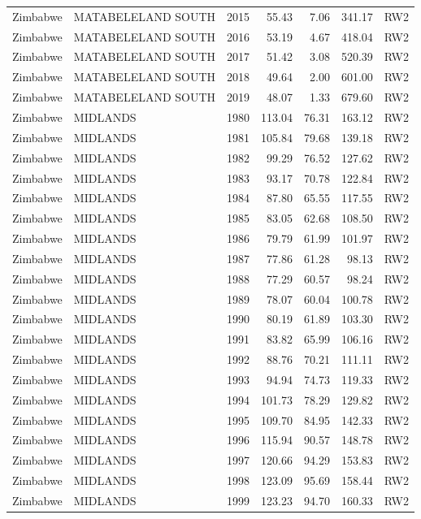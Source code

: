 \begin{longtable}{lllrrrl}
  Zimbabwe & MATABELELAND SOUTH & 2015 & 55.43 & 7.06 & 341.17 & RW2 \\ 
  Zimbabwe & MATABELELAND SOUTH & 2016 & 53.19 & 4.67 & 418.04 & RW2 \\ 
  Zimbabwe & MATABELELAND SOUTH & 2017 & 51.42 & 3.08 & 520.39 & RW2 \\ 
  Zimbabwe & MATABELELAND SOUTH & 2018 & 49.64 & 2.00 & 601.00 & RW2 \\ 
  Zimbabwe & MATABELELAND SOUTH & 2019 & 48.07 & 1.33 & 679.60 & RW2 \\ 
  Zimbabwe & MIDLANDS & 1980 & 113.04 & 76.31 & 163.12 & RW2 \\ 
  Zimbabwe & MIDLANDS & 1981 & 105.84 & 79.68 & 139.18 & RW2 \\ 
  Zimbabwe & MIDLANDS & 1982 & 99.29 & 76.52 & 127.62 & RW2 \\ 
  Zimbabwe & MIDLANDS & 1983 & 93.17 & 70.78 & 122.84 & RW2 \\ 
  Zimbabwe & MIDLANDS & 1984 & 87.80 & 65.55 & 117.55 & RW2 \\ 
  Zimbabwe & MIDLANDS & 1985 & 83.05 & 62.68 & 108.50 & RW2 \\ 
  Zimbabwe & MIDLANDS & 1986 & 79.79 & 61.99 & 101.97 & RW2 \\ 
  Zimbabwe & MIDLANDS & 1987 & 77.86 & 61.28 & 98.13 & RW2 \\ 
  Zimbabwe & MIDLANDS & 1988 & 77.29 & 60.57 & 98.24 & RW2 \\ 
  Zimbabwe & MIDLANDS & 1989 & 78.07 & 60.04 & 100.78 & RW2 \\ 
  Zimbabwe & MIDLANDS & 1990 & 80.19 & 61.89 & 103.30 & RW2 \\ 
  Zimbabwe & MIDLANDS & 1991 & 83.82 & 65.99 & 106.16 & RW2 \\ 
  Zimbabwe & MIDLANDS & 1992 & 88.76 & 70.21 & 111.11 & RW2 \\ 
  Zimbabwe & MIDLANDS & 1993 & 94.94 & 74.73 & 119.33 & RW2 \\ 
  Zimbabwe & MIDLANDS & 1994 & 101.73 & 78.29 & 129.82 & RW2 \\ 
  Zimbabwe & MIDLANDS & 1995 & 109.70 & 84.95 & 142.33 & RW2 \\ 
  Zimbabwe & MIDLANDS & 1996 & 115.94 & 90.57 & 148.78 & RW2 \\ 
  Zimbabwe & MIDLANDS & 1997 & 120.66 & 94.29 & 153.83 & RW2 \\ 
  Zimbabwe & MIDLANDS & 1998 & 123.09 & 95.69 & 158.44 & RW2 \\ 
  Zimbabwe & MIDLANDS & 1999 & 123.23 & 94.70 & 160.33 & RW2 \\ 

\end{longtable}
